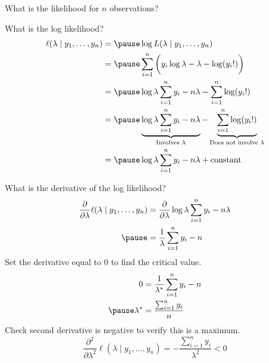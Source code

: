 \documentclass{beamer}
\begin{document}
\begin{frame}
What is the likelihood for $n$ observations? \pause
\begin{center}
\end{center}
\end{frame}

\begin{frame}
What is the log likelihood? \pause
$$\begin{aligned}
\ell(\lambda \mid y_1,\dots,y_n) &= \pause \log L(\lambda\mid y_1,\dots,y_n) \\
&= \pause \sum_{i=1}^n \bigg(y_i\log \lambda - \lambda - \log(y_i!)\bigg) \\
&= \pause \log \lambda\sum_{i=1}^n y_i - n\lambda - \sum_{i=1}^n\log(y_i!) \\
&= \pause \underbrace{\log \lambda\sum_{i=1}^n y_i - n\lambda}_{\text{Involves }\lambda} - \underbrace{\sum_{i=1}^n\log(y_i!)}_{\text{Does not involve }\lambda} \\
&= \pause \log \lambda\sum_{i=1}^n y_i - n\lambda + \text{constant}
\end{aligned}$$
\end{frame}

\begin{frame}
What is the derivative of the log likelihood? \pause
$$\begin{aligned}
\frac{\partial}{\partial\lambda} \ell(\lambda\mid y_1,\dots,y_n) &= \frac{\partial}{\partial\lambda}  \log \lambda\sum_{i=1}^n y_i - n\lambda \\ \pause
&= \frac{1}{\lambda}\sum_{i=1}^n y_i - n
\end{aligned}$$ \pause
Set the derivative equal to 0 to find the critical value.
$$\begin{aligned}
0 &= \frac{1}{\lambda^*}\sum_{i=1}^n y_i - n \\ \pause
\lambda^* &= \frac{\sum_{i=1}^n y_i}{n}
\end{aligned}$$ \pause
Check second derivative is negative to verify this is a maximum. \pause
$$\frac{\partial^2}{\partial\lambda^2} \ell(\lambda\mid y_1,\dots,y_n) = -\frac{\sum_{i=1}^n y_i}{\lambda^2} < 0$$
\end{frame}
\end{document}
